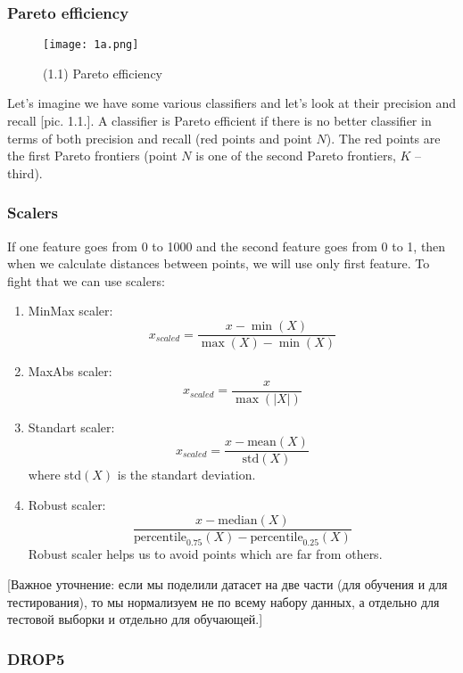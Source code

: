 \newpage
\subsubsection*{Pareto efficiency}

\begin{wrapfigure}{r}{0.25\linewidth}
	\vspace{-1.25cm}
  \begin{center}
    \texttt{[image: 1a.png]}
  \end{center}
  \vspace{-0.8cm}
  \caption*{(1.1) Pareto efficiency}
  \vspace{-1cm}
\end{wrapfigure}
Let's imagine we have some various classifiers and let's look at their precision and recall [pic. 1.1.]. A classifier is Pareto efficient if there is no better classifier in terms of both precision and recall (red points and point $N$). The red points are the first Pareto frontiers (point $N$ is one of the second Pareto frontiers, $K$ -- third).

\subsubsection*{Scalers}

If one feature goes from 0 to 1000 and the second feature goes from 0 to 1, then when we calculate distances between points, we will use only first feature. To fight that we can use scalers:
\begin{enumerate}[label=$\bullet$]
	\item MinMax scaler: $$x_{scaled}=\frac{x-\min(X)}{\max(X)-\min(X)}$$
	\item MaxAbs scaler: $$x_{scaled}=\frac{x}{\max(|X|)}$$
	\item Standart scaler: $$x_{scaled}=\frac{x-\text{mean}(X)}{\text{std}(X)}$$ where std$(X)$ is the standart deviation.
	\item Robust scaler: $$\frac{x-\text{median}(X)}{\text{percentile}_{0.75}(X)-\text{percentile}_{0.25}(X)}$$
	Robust scaler helps us to avoid points which are far from others.
\end{enumerate}
[Важное уточнение: если мы поделили датасет на две части (для обучения и для тестирования), то мы нормализуем не по всему набору данных, а отдельно для тестовой выборки и отдельно для обучающей.]

\subsubsection*{DROP5}

